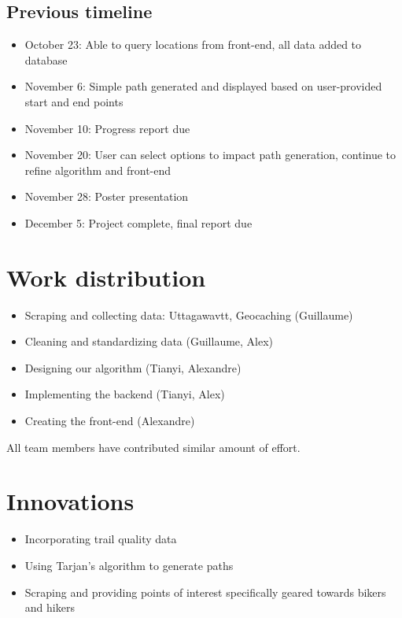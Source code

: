 \documentclass[sigconf]{acmart}
\begin{document}
\subsection{Previous timeline}
\begin{itemize}
	\item October 23: Able to query locations from front-end, all data added to database
	\item November 6: Simple path generated and displayed based on user-provided start and end points
	\item November 10: Progress report due
	\item November 20: User can select options to impact path generation, continue to refine algorithm and front-end
	\item November 28: Poster presentation
	\item December 5: Project complete, final report due
\end{itemize}

\section{Work distribution}

\begin{itemize}
	\item Scraping and collecting data: Uttagawavtt, Geocaching (Guillaume)
	\item Cleaning and standardizing data (Guillaume, Alex)
	\item Designing our algorithm (Tianyi, Alexandre)
	\item Implementing the backend (Tianyi, Alex)
	\item Creating the front-end (Alexandre)
\end{itemize}

All team members have contributed similar amount of effort.

\section{Innovations}
\begin{itemize}
	\item Incorporating trail quality data
	\item Using Tarjan's algorithm to generate paths
	\item Scraping and providing points of interest specifically geared towards bikers and hikers
\end{itemize}
\end{document}
